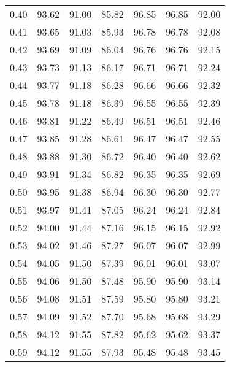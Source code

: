 \begin{tabular}{|c|c|c|c|c|c|c|}
      0.40 &     93.62 &     91.00 &      85.82 &   96.85 &      96.85 &         92.00 \\
      0.41 &     93.65 &     91.03 &      85.93 &   96.78 &      96.78 &         92.08 \\
      0.42 &     93.69 &     91.09 &      86.04 &   96.76 &      96.76 &         92.15 \\
      0.43 &     93.73 &     91.13 &      86.17 &   96.71 &      96.71 &         92.24 \\
      0.44 &     93.77 &     91.18 &      86.28 &   96.66 &      96.66 &         92.32 \\
      0.45 &     93.78 &     91.18 &      86.39 &   96.55 &      96.55 &         92.39 \\
      0.46 &     93.81 &     91.22 &      86.49 &   96.51 &      96.51 &         92.46 \\
      0.47 &     93.85 &     91.28 &      86.61 &   96.47 &      96.47 &         92.55 \\
      0.48 &     93.88 &     91.30 &      86.72 &   96.40 &      96.40 &         92.62 \\
      0.49 &     93.91 &     91.34 &      86.82 &   96.35 &      96.35 &         92.69 \\
      0.50 &     93.95 &     91.38 &      86.94 &   96.30 &      96.30 &         92.77 \\
      0.51 &     93.97 &     91.41 &      87.05 &   96.24 &      96.24 &         92.84 \\
      0.52 &     94.00 &     91.44 &      87.16 &   96.15 &      96.15 &         92.92 \\
      0.53 &     94.02 &     91.46 &      87.27 &   96.07 &      96.07 &         92.99 \\
      0.54 &     94.05 &     91.50 &      87.39 &   96.01 &      96.01 &         93.07 \\
      0.55 &     94.06 &     91.50 &      87.48 &   95.90 &      95.90 &         93.14 \\
      0.56 &     94.08 &     91.51 &      87.59 &   95.80 &      95.80 &         93.21 \\
      0.57 &     94.09 &     91.52 &      87.70 &   95.68 &      95.68 &         93.29 \\
      0.58 &     94.12 &     91.55 &      87.82 &   95.62 &      95.62 &         93.37 \\
      0.59 &     94.12 &     91.55 &      87.93 &   95.48 &      95.48 &         93.45 \\

\end{tabular}
